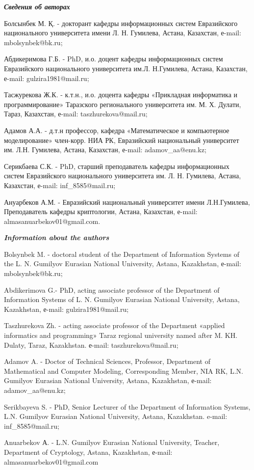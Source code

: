 \begin{authorinfo}
\hspace{1em}\emph{{\bfseries Сведения об авторах}}

Болсынбек М. Қ. - докторант кафедры информационных систем Евразийского
национального университета имени Л. Н. Гумилева, Астана, Казахстан,
е-mail: mbolsynbek@bk.ru;

Абдикеримова Г.Б. - PhD, и.о. доцент кафедры информационных систем
Евразийского национального университета им.Л. Н.Гумилева, Астана,
Казахстан, е-mail: gulzira1981@mail.ru;

Тасжурекова Ж.К. - к.т.н., и.о. доцента кафедры «Прикладная
информатика и программирование» Таразского регионального университета
им. М. Х. Дулати, Тараз, Казахстан, е-mail: taszhurekova@mail.ru; 

Адамов А.А. - д.т.н профессор, кафедра «Математическое и
компьютерное моделирование» член-корр. НИА РК, Евразийский национальный
университет им. Л.Н. Гумилева, Астана, Казахстан, е-mail: adamov\_aa@enu.kz;

Серикбаева С.К. - PhD, старший преподаватель кафедры информационных
систем Евразийского национального университета им. Л. Н. Гумилева,
Астана, Казахстан, е-mail: inf\_8585@mail.ru;

Ануарбеков А.М. - Евразийский национальный университет имени
Л.Н.Гумилева, Преподаватель кафедры криптологии, Астана, Казахстан,
е-mail: almasanuarbekov01@gmail.com.

\hspace{1em}\emph{{\bfseries Information about the authors}}

Bolsynbek M. - doctoral student of the Department of Information Systems
of the L. N. Gumilyov Eurasian National University, Astana, Kazakhstan,
е-mail: mbolsynbek@bk.ru;

Abdikerimova G.- PhD, acting associate professor of the Department of
Information Systems of L. N. Gumilyov Eurasian National University,
Astana, Kazakhstan, е-mail: gulzira1981@mail.ru;

Taszhurekova Zh. - acting associate professor of the Department «applied
informatics and programming» Taraz regional university named after M.
KH. Dulaty, Taraz, Kazakhstan. е-mail: taszhurekova@mail.ru; 

Adamov A. - Doctor of Technical Sciences, Professor, Department of
Mathematical and Computer Modeling, Corresponding Member, NIA RK, L.N.
Gumilyov Eurasian National University, Astana, Kazakhstan, е-mail:
adamov\_aa@enu.kz;

Serikbayeva S. - PhD, Senior Lecturer of the Department of Information
Systems, L.N. Gumilyov Eurasian National University, Astana, Kazakhstan.
e-mail: inf\_8585@mail.ru;

Anuarbekov А. - L.N. Gumilyov Eurasian National University, Teacher,
Department of Cryptology, Astana, Kazakhstan, е-mail:
almasanuarbekov01@gmail.com
\end{authorinfo}
